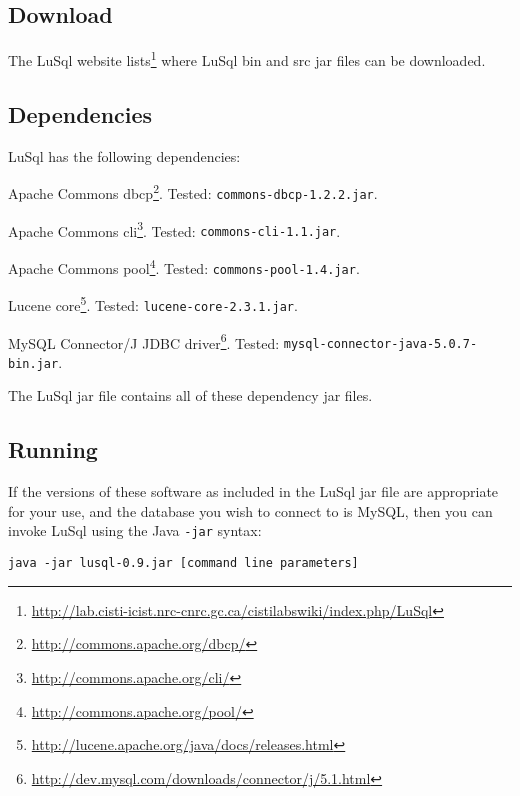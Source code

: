 
\subsection{Download}
The LuSql website
lists\footnote{\url{http://lab.cisti-icist.nrc-cnrc.gc.ca/cistilabswiki/index.php/LuSql}}
  where LuSql bin and src jar files can be downloaded.



\subsection{Dependencies}
LuSql has the following dependencies:
\begin{mlist}
 \item Apache Commons dbcp\footnote{\url{http://commons.apache.org/dbcp/}}. 
   Tested: {\tt commons-dbcp-1.2.2.jar}. 

\item Apache Commons cli\footnote{\url{http://commons.apache.org/cli/}}.
   Tested: {\tt commons-cli-1.1.jar}.

 \item Apache Commons pool\footnote{\url{http://commons.apache.org/pool/}}.
   Tested: {\tt commons-pool-1.4.jar}.
  
 \item Lucene core\footnote{\url{http://lucene.apache.org/java/docs/releases.html}}.
   Tested: {\tt lucene-core-2.3.1.jar}.

 \item MySQL
     Connector/J JDBC driver\footnote{\url{http://dev.mysql.com/downloads/connector/j/5.1.html}}.
     Tested: {\tt mysql-connector-java-5.0.7-bin.jar}.
\end{mlist}
\noindent The LuSql jar file contains all of these dependency jar files.

\subsection{Running}
If the versions of these software as included in the LuSql jar file are
appropriate for your use, and the database you wish to connect to is MySQL,
then you can invoke LuSql using the Java {\tt -jar} syntax:
{\small
\begin{lstlisting}[backgroundcolor=\color{grey}]
  java -jar lusql-0.9.jar [command line parameters]
\end{lstlisting}
}

